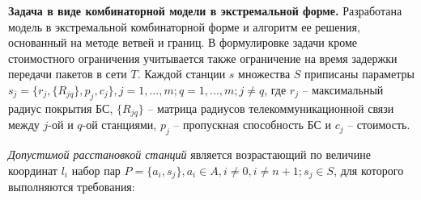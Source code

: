 


\textbf{Задача в виде комбинаторной модели в экстремальной форме.} Разработана модель в экстремальной комбинаторной форме и алгоритм ее решения, основанный на методе ветвей и границ. В формулировке задачи кроме стоимостного ограничения учитывается также ограничение на время задержки передачи пакетов в сети $T$. Каждой станции $s$ множества $S$ приписаны параметры $s_j=\{r_j,\{R_{jq} \},p_j, c_j \},j=1,...,m;q=1,...,m;j \neq q $, где $r_j$ -- максимальный радиус покрытия БС, $\{R_{jq} \}$ -- матрица радиусов телекоммуникационной связи между $j$-ой и $q$-ой станциями, $p_j$ -- пропускная способность БС и $c_j$ -- стоимость.




\textit{Допустимой расстановкой станций} является возрастающий по величине координат $l_i$  набор пар $P = \{a_i, s_j\},a_i \in A,i \neq 0,i \neq n+1;s_j \in S$, для которого выполняются требования:

